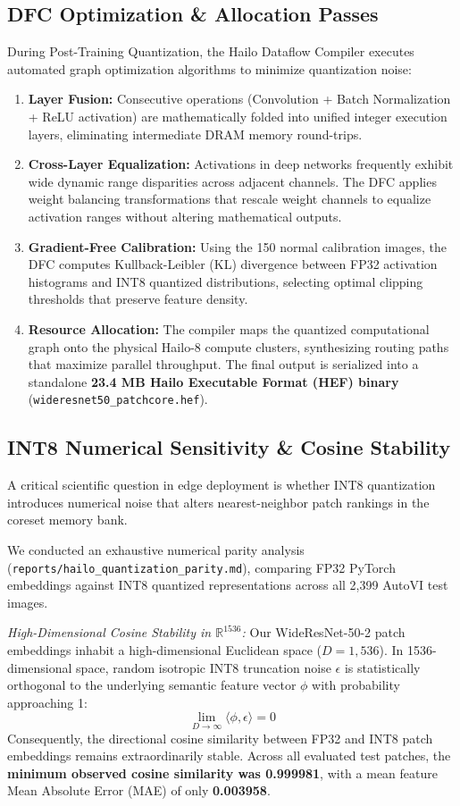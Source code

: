 \documentclass[journal,twocolumn]{IEEEtran}
\begin{document}
\subsection{DFC Optimization & Allocation Passes}
During Post-Training Quantization, the Hailo Dataflow Compiler executes automated graph optimization algorithms to minimize quantization noise:
\begin{enumerate}
    \item \textbf{Layer Fusion:} Consecutive operations (Convolution + Batch Normalization + ReLU activation) are mathematically folded into unified integer execution layers, eliminating intermediate DRAM memory round-trips.
    \item \textbf{Cross-Layer Equalization:} Activations in deep networks frequently exhibit wide dynamic range disparities across adjacent channels. The DFC applies weight balancing transformations that rescale weight channels to equalize activation ranges without altering mathematical outputs.
    \item \textbf{Gradient-Free Calibration:} Using the 150 normal calibration images, the DFC computes Kullback-Leibler (KL) divergence between FP32 activation histograms and INT8 quantized distributions, selecting optimal clipping thresholds that preserve feature density.
    \item \textbf{Resource Allocation:} The compiler maps the quantized computational graph onto the physical Hailo-8 compute clusters, synthesizing routing paths that maximize parallel throughput. The final output is serialized into a standalone \textbf{23.4 MB Hailo Executable Format (HEF) binary} (\texttt{wideresnet50\_patchcore.hef}).
\end{enumerate}

\subsection{INT8 Numerical Sensitivity & Cosine Stability}
A critical scientific question in edge deployment is whether INT8 quantization introduces numerical noise that alters nearest-neighbor patch rankings in the coreset memory bank.

We conducted an exhaustive numerical parity analysis (\texttt{reports/hailo\_quantization\_parity.md}), comparing FP32 PyTorch embeddings against INT8 quantized representations across all 2,399 AutoVI test images.

\textit{High-Dimensional Cosine Stability in $\mathbb{R}^{1536}$:} Our WideResNet-50-2 patch embeddings inhabit a high-dimensional Euclidean space ($D = 1,536$). In 1536-dimensional space, random isotropic INT8 truncation noise $\epsilon$ is statistically orthogonal to the underlying semantic feature vector $\phi$ with probability approaching 1:
\begin{equation}
\lim_{D \to \infty} \langle \phi, \epsilon \rangle = 0
\end{equation}
Consequently, the directional cosine similarity between FP32 and INT8 patch embeddings remains extraordinarily stable. Across all evaluated test patches, the \textbf{minimum observed cosine similarity was 0.999981}, with a mean feature Mean Absolute Error (MAE) of only \textbf{0.003958}.
\end{document}
